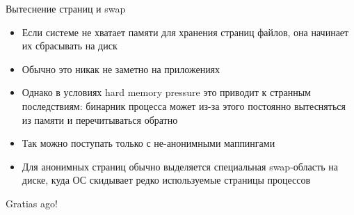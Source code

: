 \documentclass[10pt,pdf,hyperref={unicode}]{beamer}
\begin{document}
\begin{frame}{Вытеснение страниц и swap}
\begin{itemize}
    \item Если системе не хватает памяти для хранения страниц файлов, она начинает их сбрасывать на диск
    \item Обычно это никак не заметно на приложениях
    \item Однако в условиях hard memory pressure это приводит к странным последствиям: бинарник процесса может из-за этого постоянно вытесняться из памяти и перечитываться обратно
    \item Так можно поступать только с не-анонимными маппингами
    \item Для анонимных страниц обычно выделяется специальная swap-область на диске, куда ОС скидывает редко используемые страницы процессов
\end{itemize}
\end{frame}

\begin{frame}
\center\Huge{Gratias ago!}
\end{frame}
\end{document}
